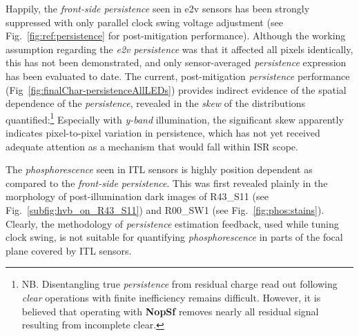 Happily, the {\it front-side persistence} seen in e2v sensors has been strongly suppressed with only parallel clock swing voltage adjustment (see Fig.~\ref{fig:ref:persistence} for post-mitigation performance). Although the working assumption regarding the {\it e2v persistence} was that it affected all pixels identically, this has not been demonstrated, and only sensor-averaged {\it persistence} expression has been evaluated to date. The current, post-mitigation {\it persistence} performance (Fig~\ref{fig:finalChar-persistenceAllLEDs}) provides indirect evidence of the spatial dependence of the {\it persistence}, revealed in the {\it skew} of the distributions quantified:\footnote{NB. Disentangling true {\it persistence} from residual charge read out following {\it clear} operations with finite inefficiency remains difficult. However, it is believed that operating with {\bf NopSf} removes nearly all residual signal resulting from incomplete clear.} Especially with {\it y-band} illumination, the significant skew apparently indicates pixel-to-pixel variation in persistence, which has not yet received adequate attention as a mechanism that would fall within ISR scope.

The {\it phosphorescence} seen in ITL sensors is highly position dependent as compared to the {\it front-side persistence}. This was first revealed plainly in the morphology of post-illumination dark images of R43\_S11 (see Fig.~\ref{subfig:hvb_on_R43_S11}) and R00\_SW1 (see Fig.~\ref{fig:phos:stains}). Clearly, the methodology of {\it persistence} estimation feedback, used while tuning clock swing, is not suitable for quantifying {\it phosphorescence} in parts of the focal plane covered by ITL sensors.

